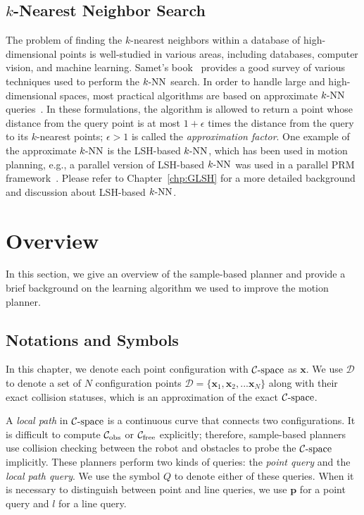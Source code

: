 \subsection{$k$-Nearest Neighbor Search}
The problem of finding the $k$-nearest neighbors within a database of high-dimensional points is well-studied in various areas, including databases, computer vision, and machine learning. Samet's book~\cite{Samet:2005:FMM} provides a good survey of various techniques used to perform the $k\text{-NN}$ search. In order to handle large and high-dimensional spaces, most practical algorithms are based on approximate $k\text{-NN}$ queries~\cite{Chakrabarti:FOCS}. In these formulations, the algorithm is allowed to return a point whose distance from the query point is at most $1+\epsilon$ times the distance from the query to its $k$-nearest points; $\epsilon > 1$ is called the \emph{approximation factor}. One example of the approximate $k\text{-NN}$ is the LSH-based $k\text{-NN}$, which has been used in motion planning, e.g., a parallel version of LSH-based $k\text{-NN}$ was used in a parallel PRM framework~\cite{Pan:IROS:2010}. Please refer to Chapter~\ref{chp:GLSH} for a more detailed background and discussion about LSH-based $k\text{-NN}$.



\section{Overview}
\label{sec:3:overview}
In this section, we give an overview of the sample-based planner and provide a brief background on the learning algorithm we used to improve the motion planner.


\subsection{Notations and Symbols}
In this chapter, we denote each point configuration with $\mathcal C\text{-space}$ as $\mathbf x$. We use $\mathcal D$ to denote a set of $N$ configuration points $\mathcal D = \{\mathbf x_1, \mathbf x_2, ... \mathbf x_N\}$ along with their exact collision statuses, which is an approximation of the exact $\mathcal C\text{-space}$.

A \emph{local path} in $\mathcal C\text{-space}$ is a continuous curve that connects two configurations.
It is difficult to compute $\mathcal C_{\text{obs}}$ or $\mathcal C_{\text{free}}$ explicitly; therefore, sample-based planners use collision checking between the robot and obstacles to probe the $\mathcal C\text{-space}$ implicitly. These planners perform two kinds of queries: the \emph{point query} and the \emph{local path query}. We use the symbol $Q$ to denote either of these queries. When it is necessary to distinguish between point and line queries, we use $\mathbf p$ for a point query and $l$ for a line query.

